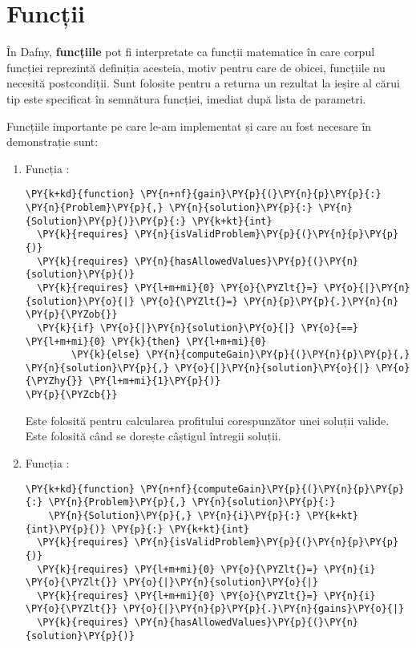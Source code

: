 \begin{sloppypar}
\section{Funcții}
În Dafny, \textbf{funcțiile} pot fi interpretate ca funcții matematice în care corpul funcției reprezintă definiția acesteia, motiv pentru care de obicei, funcțiile nu necesită postcondiții. Sunt folosite pentru a returna un rezultat la ieșire al cărui tip este specificat în semnătura funcției, imediat după lista de parametri. \par 
Funcțiile importante pe care le-am implementat și care au fost necesare în demonstrație sunt:
\begin{enumerate}
    \item Funcția :
    \begin{Verbatim}[commandchars=\\\{\}]
\PY{k+kd}{function} \PY{n+nf}{gain}\PY{p}{(}\PY{n}{p}\PY{p}{:} \PY{n}{Problem}\PY{p}{,} \PY{n}{solution}\PY{p}{:} \PY{n}{Solution}\PY{p}{)}\PY{p}{:} \PY{k+kt}{int}
  \PY{k}{requires} \PY{n}{isValidProblem}\PY{p}{(}\PY{n}{p}\PY{p}{)}
  \PY{k}{requires} \PY{n}{hasAllowedValues}\PY{p}{(}\PY{n}{solution}\PY{p}{)}
  \PY{k}{requires} \PY{l+m+mi}{0} \PY{o}{\PYZlt{}=} \PY{o}{|}\PY{n}{solution}\PY{o}{|} \PY{o}{\PYZlt{}=} \PY{n}{p}\PY{p}{.}\PY{n}{n}
\PY{p}{\PYZob{}}
  \PY{k}{if} \PY{o}{|}\PY{n}{solution}\PY{o}{|} \PY{o}{==} \PY{l+m+mi}{0} \PY{k}{then} \PY{l+m+mi}{0} 
        \PY{k}{else} \PY{n}{computeGain}\PY{p}{(}\PY{n}{p}\PY{p}{,} \PY{n}{solution}\PY{p}{,} \PY{o}{|}\PY{n}{solution}\PY{o}{|} \PY{o}{\PYZhy{}} \PY{l+m+mi}{1}\PY{p}{)}
\PY{p}{\PYZcb{}}
\end{Verbatim}
    Este folosită pentru calcularea profitului corespunzător unei soluții valide. Este folosită când se dorește câștigul întregii soluții.
    \item Funcția :
    \begin{Verbatim}[commandchars=\\\{\}]
\PY{k+kd}{function} \PY{n+nf}{computeGain}\PY{p}{(}\PY{n}{p}\PY{p}{:} \PY{n}{Problem}\PY{p}{,} \PY{n}{solution}\PY{p}{:} 
    \PY{n}{Solution}\PY{p}{,} \PY{n}{i}\PY{p}{:} \PY{k+kt}{int}\PY{p}{)} \PY{p}{:} \PY{k+kt}{int}
  \PY{k}{requires} \PY{n}{isValidProblem}\PY{p}{(}\PY{n}{p}\PY{p}{)}
  \PY{k}{requires} \PY{l+m+mi}{0} \PY{o}{\PYZlt{}=} \PY{n}{i} \PY{o}{\PYZlt{}} \PY{o}{|}\PY{n}{solution}\PY{o}{|}
  \PY{k}{requires} \PY{l+m+mi}{0} \PY{o}{\PYZlt{}=} \PY{n}{i} \PY{o}{\PYZlt{}} \PY{o}{|}\PY{n}{p}\PY{p}{.}\PY{n}{gains}\PY{o}{|}
  \PY{k}{requires} \PY{n}{hasAllowedValues}\PY{p}{(}\PY{n}{solution}\PY{p}{)}

\end{Verbatim}
\end{enumerate}
\end{sloppypar}
